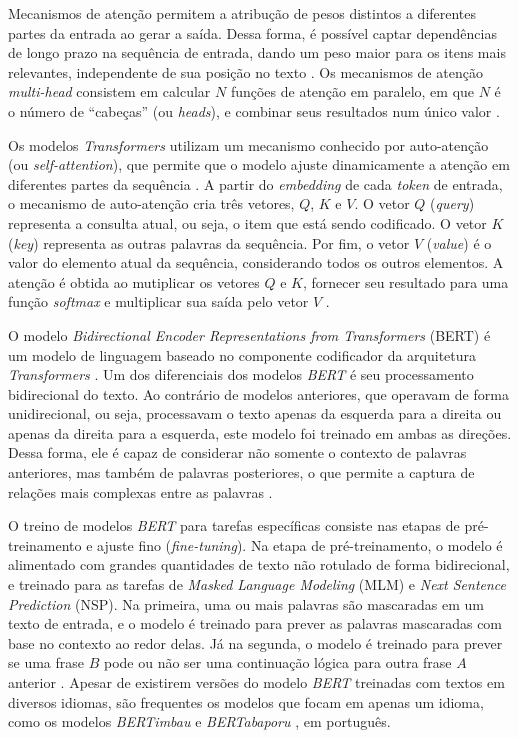 \documentclass[
	12pt, oneside, a4paper, english, brazil
]{abntex2ppgsi}
\begin{document}
Mecanismos de atenção permitem a atribução de pesos distintos a diferentes partes da entrada ao gerar a saída. Dessa forma, é possível captar dependências de longo prazo na sequência de entrada, dando um peso maior para os itens mais relevantes, independente de sua posição no texto \cite{attention}. Os mecanismos de atenção {\em multi-head} consistem em calcular $N$ funções de atenção em paralelo, em que $N$ é o número de ``cabeças'' (ou {\em heads}), e combinar seus resultados num único valor \cite{SOUZA2023110901}. 

Os modelos {\em Transformers} utilizam um mecanismo conhecido por auto-atenção (ou {\em self-attention}), que permite que o modelo ajuste dinamicamente a atenção em diferentes partes da sequência \cite{pln2023}. A partir do {\em embedding} de cada {\em token} de entrada, o mecanismo de auto-atenção cria três vetores, $Q$, $K$ e $V$. O vetor $Q$ ({\em query}) representa a consulta atual, ou seja, o item que está sendo codificado. O vetor $K$ ({\em key}) representa as outras palavras da sequência. Por fim, o vetor $V$ ({\em value}) é o valor do elemento atual da sequência, considerando todos os outros elementos. A atenção é obtida ao mutiplicar os vetores $Q$ e $K$, fornecer seu resultado para uma função {\em softmax} e multiplicar sua saída pelo vetor $V$ \cite{pln2023}.

O modelo {\em Bidirectional Encoder Representations from Transformers} (BERT) é um modelo de linguagem baseado no componente codificador da arquitetura {\em Transformers} \cite{SOUZA2023110901}. Um dos diferenciais dos modelos {\em BERT} é seu processamento bidirecional do texto. Ao contrário de modelos anteriores, que operavam de forma unidirecional, ou seja, processavam o texto apenas da esquerda para a direita ou apenas da direita para a esquerda, este modelo foi treinado em ambas as direções. Dessa forma, ele é capaz de considerar não somente o contexto de palavras anteriores, mas também de palavras posteriores, o que permite a captura de relações mais complexas entre as palavras \cite{pln2023}.

O treino de modelos {\em BERT} para tarefas específicas consiste nas etapas de pré-treinamento e ajuste fino ({\em fine-tuning}). Na etapa de pré-treinamento, o modelo é alimentado com grandes quantidades de texto não rotulado de forma bidirecional, e treinado para as tarefas de {\em Masked Language Modeling} (MLM) e {\em Next Sentence Prediction} (NSP). Na primeira, uma ou mais palavras são mascaradas em um texto de entrada, e o modelo é treinado para prever as palavras mascaradas com base no contexto ao redor delas. Já na segunda, o modelo é treinado para prever se uma frase $B$ pode ou não ser uma continuação lógica para outra frase $A$ anterior \cite{SOUZA2023110901}. Apesar de existirem versões do modelo {\em BERT} treinadas com textos em diversos idiomas, são frequentes os modelos que focam em apenas um idioma, como os modelos {\em BERTimbau} \cite{SOUZA2023110901} e {\em BERTabaporu} \cite{bertabaporu}, em português.
\end{document}
